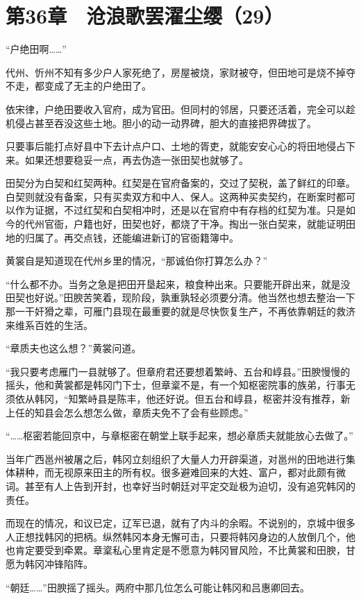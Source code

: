 \section{第36章　沧浪歌罢濯尘缨（29）}

“户绝田啊……”

代州、忻州不知有多少户人家死绝了，房屋被烧，家财被夺，但田地可是烧不掉夺不走，都变成了无主的户绝田了。

依宋律，户绝田要收入官府，成为官田。但同村的邻居，只要还活着，完全可以趁机侵占甚至吞没这些土地。胆小的动一动界碑，胆大的直接把界碑拔了。

只要事后能打点好县中下去计点户口、土地的胥吏，就能安安心心的将田地侵占下来。如果还想要稳妥一点，再去伪造一张田契也就够了。

田契分为白契和红契两种。红契是在官府备案的，交过了契税，盖了鲜红的印章。白契则就没有备案，只有买卖双方和中人、保人。这两种买卖契约，在断案时都可以作为证据，不过红契和白契相冲时，还是以在官府中有存档的红契为准。只是如今的代州官衙，户籍也好，田契也好，都烧了干净。掏出一张白契来，就能证明田地的归属了。再交点钱，还能编进新订的官衙籍簿中。

黄裳自是知道现在代州乡里的情况，“那诚伯你打算怎么办？”

“什么都不办。当务之急是把田开垦起来，粮食种出来。只要能开辟出来，就是没田契也好说。”田腴苦笑着，现阶段，孰重孰轻必须要分清。他当然也想去整治一下那一干奸猾之辈，可雁门县现在最重要的就是尽快恢复生产，不再依靠朝廷的救济来维系百姓的生活。

“章质夫也这么想？”黄裳问道。

“我只要考虑雁门一县就够了。但章府君还要想着繁峙、五台和崞县。”田腴慢慢的摇头，他和黄裳都是韩冈门下士，但章楶不是，有一个知枢密院事的族弟，行事无须依从韩冈，“知繁峙县是陈丰，他还好说。但五台和崞县，枢密并没有推荐，新上任的知县会怎么想怎么做，章质夫免不了会有些顾虑。”

“……枢密若能回京中，与章枢密在朝堂上联手起来，想必章质夫就能放心去做了。”

当年广西邕州被屠之后，韩冈立刻组织了大量人力开辟渠道，对邕州的田地进行集体耕种，而无视原来田主的所有权。很多避难回来的大姓、富户，都对此颇有微词。甚至有人上告到开封，也幸好当时朝廷对平定交趾极为迫切，没有追究韩冈的责任。

而现在的情况，和议已定，辽军已退，就有了内斗的余暇。不说别的，京城中很多人正想找韩冈的把柄。纵然韩冈本身无懈可击，只要将韩冈身边的人放倒几个，他也肯定要受到牵累。章楶私心里肯定是不愿意为韩冈冒风险，不比黄裳和田腴，甘愿为韩冈冲锋陷阵。

“朝廷……”田腴摇了摇头。两府中那几位怎么可能让韩冈和吕惠卿回去。


